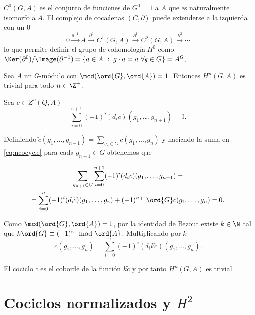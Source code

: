 \begin{observacion}
	$C^0(G,A)$ es el conjunto de funciones de $G^0=1$ a $A$ que es naturalmente isomorfo a $A$. El complejo de cocadenas $(C,\partial)$ puede extenderse a la izquierda con un $0$
	\begin{equation*}
		0 \xrightarrow{\partial^{-1}} A \xrightarrow{\partial^0} C^{1}(G,A) \xrightarrow{\partial^1} C^2(G,A) \xrightarrow{\partial^2} \cdots
	\end{equation*}
	lo que permite definir el grupo de cohomología $H^0$ como $\Ker(\partial^0)/\Image(\partial^{-1}) = \{a\in A \ : \ g\cdot a = a \ \forall g\in G \} = A^G$.
\end{observacion}


\begin{teorema}\label{thm:trivialH}
	Sea $A$ un $G$-módulo con $\mcd(\ord{G}, \ord{A}) = 1$. Entonces $H^n(G,A)$ es trivial para todo $n\in\Z^+$.
	\begin{demostracion}
		Sea $c\in Z^n(Q,A)$
		\begin{equation}\label{eq:ncocycle}
			\sum\limits_{i=0}^{n+1} (-1)^i(d_ic)(g_1,\ldots,g_{n+1}) = 0.
		\end{equation}
		
		Definiendo $\tilde c(g_1,\hdots,g_{n-1}) = {\displaystyle \sum_{g_n\in G} c(g_1,\hdots,g_{n})}$ y haciendo la suma en \eqref{eq:ncocycle} para cada $g_{n+1} \in G$ obtenemos que

		\begin{multline*}
			\sum\limits_{g_{n+1}\in G}\sum\limits_{i=0}^{n+1} (-1)^i(d_ic)(g_1,\ldots,g_{n+1}) = \\ 
			= \sum\limits_{i=0}^{n} (-1)^i(d_i\tilde c)(g_1,\ldots,g_n) + (-1)^{n+1}\ord{G} c(g_1,\ldots,g_n) = 0.
		\end{multline*}
		
		Como $\mcd(\ord{G}, \ord{A}) = 1$, por la identidad de Bezout existe $k\in \N$ tal que $k \ord{G} \equiv (-1)^{n} \mod \ord{A}$. Multiplicando por $k$
		\begin{equation*}
			c(g_1,\hdots,g_n) = \sum\limits_{i=0}^n (-1)^i(d_i k\tilde c)(g_1,\ldots,g_n).
		\end{equation*}
		
		El cociclo $c$ es el coborde de la función $k \tilde c$ y por tanto $H^n(G,A)$ es trivial.
	\end{demostracion}
\end{teorema}

\section{Cociclos normalizados y $H^2$}

